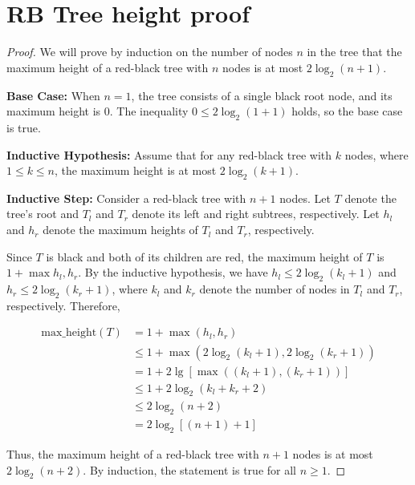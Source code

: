 \documentclass{article}
\begin{document}
\section{RB Tree height proof}
\begin{proof}
We will prove by induction on the number of nodes $n$ in the tree that the maximum height of a red-black tree with $n$ nodes is at most $2 \log_2(n+1)$.

\textbf{Base Case:} When $n=1$, the tree consists of a single black root node, and its maximum height is 0. The inequality $0 \leq 2\log_2(1+1)$ holds, so the base case is true.

\textbf{Inductive Hypothesis:} Assume that for any red-black tree with $k$ nodes, where $1 \leq k \leq n$, the maximum height is at most $2 \log_2(k+1)$.

\textbf{Inductive Step:} Consider a red-black tree with $n+1$ nodes. Let $T$ denote the tree's root and $T_l$ and $T_r$ denote its left and right subtrees, respectively. Let $h_l$ and $h_r$ denote the maximum heights of $T_l$ and $T_r$, respectively.

Since $T$ is black and both of its children are red, the maximum height of $T$ is $1 + \max{h_l, h_r}$. By the inductive hypothesis, we have $h_l \leq 2\log_2(k_l+1)$ and $h_r \leq 2\log_2(k_r+1)$, where $k_l$ and $k_r$ denote the number of nodes in $T_l$ and $T_r$, respectively. Therefore,

\begin{align*}
 \text{max\_height}(T) &= 1 + \max{(h_l, h_r)} \\
 &\leq 1 + \max{(2\log_2(k_l+1), 2\log_2(k_r+1))} \\
 &= 1 + 2\lg\left[\max{((k_l+1), (k_r+1))}\right] \\
 &\leq 1 + 2\log_2(k_l + k_r + 2) \\
 &\leq 2\log_2(n+2) \\
 &= 2\log_2[(n+1)+1]
\end{align*}

Thus, the maximum height of a red-black tree with $n+1$ nodes is at most $2\log_2(n+2)$. By induction, the statement is true for all $n \geq 1$.
\end{proof}
\end{document}
